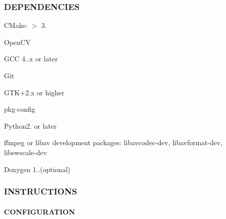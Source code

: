 \subsubsection*{D\+E\+P\+E\+N\+D\+E\+N\+C\+I\+ES}


\begin{DoxyEnumerate}
\item C\+Make\+: $>$ 3.
\item Open\+CV
\end{DoxyEnumerate}
\begin{DoxyItemize}
\item G\+CC 4..\+x or later
\item Git
\item G\+T\+K+2.x or higher
\item pkg-\/config
\item Python2. or later
\item ffmpeg or libav development packages\+: libavcodec-\/dev, libavformat-\/dev, libswscale-\/dev
\end{DoxyItemize}
\begin{DoxyEnumerate}
\item Doxygen 1..(optional)
\end{DoxyEnumerate}

\subsubsection*{I\+N\+S\+T\+R\+U\+C\+T\+I\+O\+NS}

\paragraph*{C\+O\+N\+F\+I\+G\+U\+R\+A\+T\+I\+ON}

